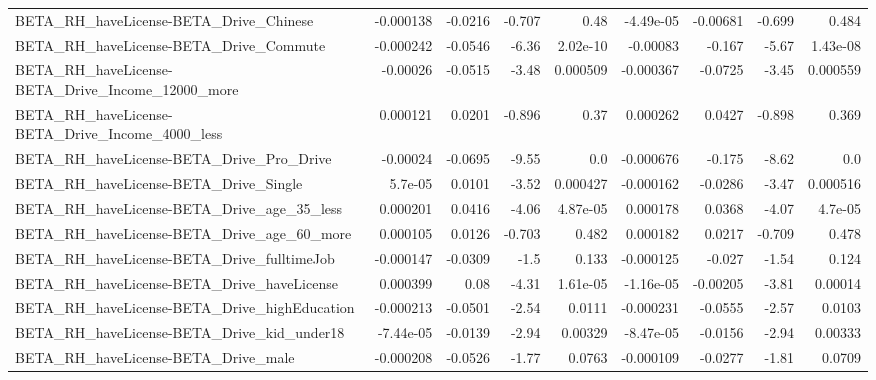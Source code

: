 \begin{tabular}{lrrrrrrrr}
BETA\_RH\_haveLicense-BETA\_Drive\_Chinese             &   -0.000138 &      -0.0216 &    -0.707 &     0.48 &  -4.49e-05 &    -0.00681 &       -0.699 &         0.484 \\
BETA\_RH\_haveLicense-BETA\_Drive\_Commute             &   -0.000242 &      -0.0546 &     -6.36 & 2.02e-10 &   -0.00083 &      -0.167 &        -5.67 &      1.43e-08 \\
BETA\_RH\_haveLicense-BETA\_Drive\_Income\_12000\_more   &    -0.00026 &      -0.0515 &     -3.48 & 0.000509 &  -0.000367 &     -0.0725 &        -3.45 &      0.000559 \\
BETA\_RH\_haveLicense-BETA\_Drive\_Income\_4000\_less    &    0.000121 &       0.0201 &    -0.896 &     0.37 &   0.000262 &      0.0427 &       -0.898 &         0.369 \\
BETA\_RH\_haveLicense-BETA\_Drive\_Pro\_Drive           &    -0.00024 &      -0.0695 &     -9.55 &      0.0 &  -0.000676 &      -0.175 &        -8.62 &           0.0 \\
BETA\_RH\_haveLicense-BETA\_Drive\_Single              &     5.7e-05 &       0.0101 &     -3.52 & 0.000427 &  -0.000162 &     -0.0286 &        -3.47 &      0.000516 \\
BETA\_RH\_haveLicense-BETA\_Drive\_age\_35\_less         &    0.000201 &       0.0416 &     -4.06 & 4.87e-05 &   0.000178 &      0.0368 &        -4.07 &       4.7e-05 \\
BETA\_RH\_haveLicense-BETA\_Drive\_age\_60\_more         &    0.000105 &       0.0126 &    -0.703 &    0.482 &   0.000182 &      0.0217 &       -0.709 &         0.478 \\
BETA\_RH\_haveLicense-BETA\_Drive\_fulltimeJob         &   -0.000147 &      -0.0309 &      -1.5 &    0.133 &  -0.000125 &      -0.027 &        -1.54 &         0.124 \\
BETA\_RH\_haveLicense-BETA\_Drive\_haveLicense         &    0.000399 &         0.08 &     -4.31 & 1.61e-05 &  -1.16e-05 &    -0.00205 &        -3.81 &       0.00014 \\
BETA\_RH\_haveLicense-BETA\_Drive\_highEducation       &   -0.000213 &      -0.0501 &     -2.54 &   0.0111 &  -0.000231 &     -0.0555 &        -2.57 &        0.0103 \\
BETA\_RH\_haveLicense-BETA\_Drive\_kid\_under18         &   -7.44e-05 &      -0.0139 &     -2.94 &  0.00329 &  -8.47e-05 &     -0.0156 &        -2.94 &       0.00333 \\
BETA\_RH\_haveLicense-BETA\_Drive\_male                &   -0.000208 &      -0.0526 &     -1.77 &   0.0763 &  -0.000109 &     -0.0277 &        -1.81 &        0.0709 \\

\end{tabular}
